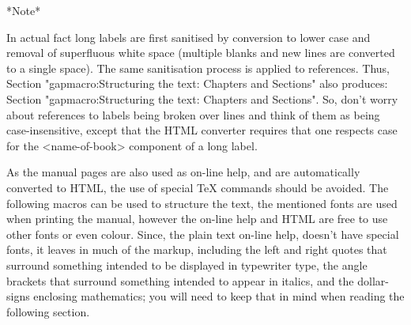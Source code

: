 *Note*

In actual fact long labels are first sanitised by conversion to lower case
and removal of superfluous white space (multiple blanks and new lines are
converted to a single space). The same sanitisation process is applied to
references. Thus, 
\begintt
Section "gapmacro:Structuring the text:                          Chapters
and Sections"
\endtt
also produces: 
Section "gapmacro:Structuring the text:                          Chapters
and Sections".
So, don't worry about references to labels being broken over  lines
and think of  them  as  being  case-insensitive,  except  that  the  HTML
converter  requires  that  one  respects  case  for  the   <name-of-book>
component of a long label.


\indextt{\\lq}\indextt{\\pif}\indextt{\\rq}
\indextt{\\>}\indextt{\\index}\indextt{\\indextt}
\indextt{\\atindex}
\indextt{\\fmark}
\indextt{\\URL}\indextt{\\Mailto}
\indextt{\\Package}\indextt{\\package}
As the manual pages are also used as on-line help, and are  automatically
converted to HTML, the use of special {\TeX} commands should be  avoided.
The following macros can be used to structure  the  text,  the  mentioned
fonts are used when printing the manual, however  the  on-line  help  and
HTML are free to use other fonts or even colour. Since,  the  plain  text
on-line help, doesn't have special  fonts,  it  leaves  in  much  of  the
markup, including the left  and  right  quotes  that  surround  something
intended to be displayed in typewriter  type,  the  angle  brackets  that
surround something intended to appear in italics,  and  the  dollar-signs
enclosing mathematics; you will need to keep that in  mind  when  reading
the following section.

